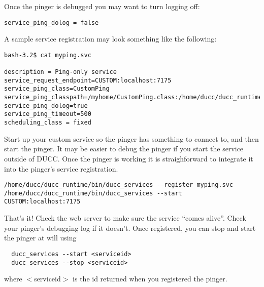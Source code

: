       Once the pinger is debugged you may want to turn logging off:
\begin{verbatim}
service_ping_dolog = false
\end{verbatim}
      
      A sample service registration may look something like the following:
\begin{verbatim}
bash-3.2$ cat myping.svc

description = Ping-only service
service_request_endpoint=CUSTOM:localhost:7175
service_ping_class=CustomPing
service_ping_classpath=/myhome/CustomPing.class:/home/ducc/ducc_runtime/lib/uima_ducc_common.jar
service_ping_dolog=true
service_ping_timeout=500
scheduling_class = fixed
\end{verbatim}
      
      Start up your custom service so the pinger has something to connect to, and then start
      the pinger.  It may be easier to debug the pinger if you start the service outside of DUCC. Once
      the pinger is working it is straighforward to integrate it into the pinger's service registration.
\begin{verbatim}
/home/ducc/ducc_runtime/bin/ducc_services --register myping.svc
/home/ducc/ducc_runtime/bin/ducc_services --start CUSTOM:localhost:7175
\end{verbatim}

      That's it!  Check the web server to make sure the service ``comes alive''.  Check your pinger's
      debugging log if it doesn't.  Once registered, you can stop and start the pinger at will using
\begin{verbatim}
  ducc_services --start <serviceid>
  ducc_services --stop <serviceid>
\end{verbatim}
     where $<$serviceid$>$ is the id returned when you registered the pinger.
